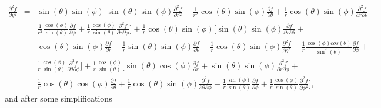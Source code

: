 \documentclass[12pt]{article}
\begin{document}
\begin{eqnarray*}
\frac{{\partial}^2 f}{\partial y^2} &=& \sin(\theta)\sin(\phi)\Big[\sin(\theta)\sin(\phi)\frac{{\partial}^2 f}{\partial r^2} - \frac{1}{r^2}\cos(\theta)\sin(\phi)\frac{\partial f}{\partial\theta} + \frac{1}{r}\cos(\theta)\sin(\phi)\frac{{\partial}^2 f}{\partial r\partial\theta} -\\
& & \frac{1}{r^2}\frac{\cos(\phi)}{\sin(\theta)}\frac{\partial f}{\partial\phi} + \frac{1}{r}\frac{\cos(\phi)}{\sin(\theta)}\frac{{\partial}^2 f}{\partial r\partial\phi}\Big] + \frac{1}{r}\cos(\theta)\sin(\phi)\Big[\sin(\theta)\sin(\phi)\frac{\partial f}{\partial r\partial\theta} + \\
& & \cos(\theta)\sin(\phi)\frac{\partial f}{\partial r} - \frac{1}{r}\sin(\theta)\sin(\phi)\frac{\partial f}{\partial\theta} + \frac{1}{r}\cos(\theta)\sin(\phi)\frac{{\partial}^2 f}{\partial{\theta}^2} - \frac{1}{r}\frac{\cos(\phi)cos(\theta)}{{\sin}^2(\theta)}\frac{\partial f}{\partial\phi} + \\
& & \frac{1}{r}\frac{\cos(\phi)}{\sin(\theta)}\frac{{\partial}^2 f}{\partial\theta\partial\phi}\Big] + \frac{1}{r}\frac{\cos(\phi)}{\sin(\theta)}\Big[\sin(\theta)\cos(\phi)\frac{\partial f}{\partial r} + \sin(\theta)\sin(\phi)\frac{{\partial}^2 f}{\partial r\partial\phi} + \\
& & \frac{1}{r}\cos(\theta)\cos(\phi)\frac{\partial f}{\partial\theta} + \frac{1}{r}\cos(\theta)\sin(\phi)\frac{{\partial}^2 f}{\partial\theta\partial\phi} - \frac{1}{r}\frac{\sin(\phi)}{\sin(\theta)}\frac{\partial f}{\partial\phi} + \frac{1}{r}\frac{\cos(\phi)}{\sin(\theta)}\frac{{\partial}^2 f}{\partial{\phi}^2}\Big],
\end{eqnarray*}
and after some simplifications
\end{document}
